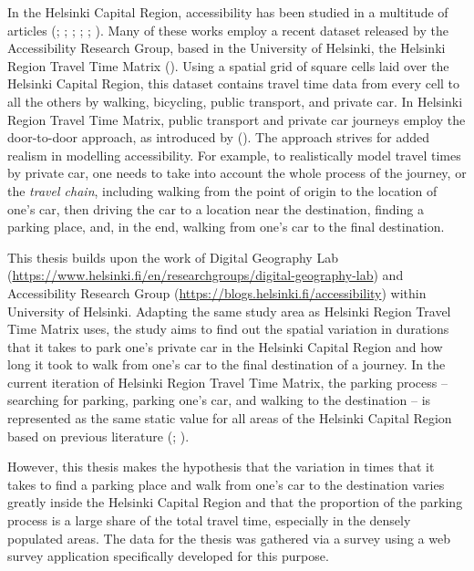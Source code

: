In the Helsinki Capital Region, accessibility has been studied in a multitude of articles (\cite{Jarvi2014}; \cite{Toivonen2014a}; \cite{Laatikainen2015}; \cite{Salonen2016}; \cite{Tenkanen2017}; \cite{Tenkanen2018}). Many of these works employ a recent dataset released by the Accessibility Research Group, based in the University of Helsinki, the Helsinki Region Travel Time Matrix (\cite{Tenkanen2018}). Using a spatial grid of square cells laid over the Helsinki Capital Region, this dataset contains travel time data from every cell to all the others by walking, bicycling, public transport, and private car. In Helsinki Region Travel Time Matrix, public transport and private car journeys employ the door-to-door approach, as introduced by \citeauthor{Salonen2013} (\citeyear{Salonen2013}). The approach strives for added realism in modelling accessibility. For example, to realistically model travel times by private car, one needs to take into account the whole process of the journey, or the \textit{travel chain}, including walking from the point of origin to the location of one's car, then driving the car to a location near the destination, finding a parking place, and, in the end, walking from one's car to the final destination.

This thesis builds upon the work of Digital Geography Lab (\textcolor{blue}{\url{https://www.helsinki.fi/en/researchgroups/digital-geography-lab}}) and Accessibility Research Group (\textcolor{blue}{\url{https://blogs.helsinki.fi/accessibility}}) within University of Helsinki. Adapting the same study area as Helsinki Region Travel Time Matrix uses, the study aims to find out the spatial variation in durations that it takes to park one's private car in the Helsinki Capital Region and how long it took to walk from one's car to the final destination of a journey. In the current iteration of Helsinki Region Travel Time Matrix, the parking process -- searching for parking, parking one's car, and walking to the destination -- is represented as the same static value for all areas of the Helsinki Capital Region based on previous literature (\cite{Tenkanen2020}; \cite{Kalenoja2003}).

However, this thesis makes the hypothesis that the variation in times that it takes to find a parking place and walk from one's car to the destination varies greatly inside the Helsinki Capital Region and that the proportion of the parking process is a large share of the total travel time, especially in the densely populated areas. The data for the thesis was gathered via a survey using a web survey application specifically developed for this purpose.

